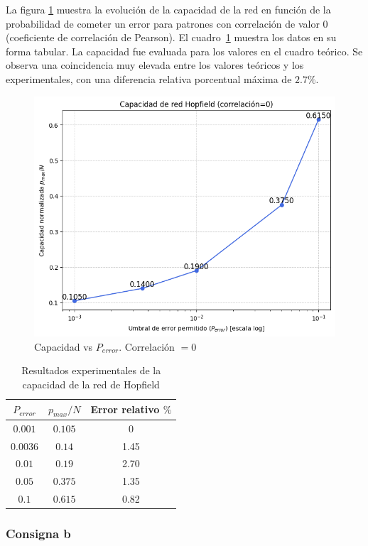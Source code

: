 \documentclass[11pt]{article} %
\begin{document}
La figura \ref{fig:ej2_1_1} muestra la evolución de la capacidad de la red en función de la probabilidad de cometer un error para patrones con correlación de valor $0$ (coeficiente de correlación de Pearson). El cuadro~\ref{tab:2} muestra los datos en su forma tabular. La capacidad fue evaluada para los valores en el cuadro teórico. Se observa una coincidencia muy elevada entre los valores teóricos y los experimentales, con una diferencia relativa porcentual máxima de $2.7\%$. 


\begin{figure}[h!]
    \centering
    \includegraphics[width=0.8\linewidth]{imgs/ej2_1_1.png}
    \caption{Capacidad vs $P_{error}$. Correlación $= 0$}
    \label{fig:ej2_1_1}
\end{figure}

\begin{table}[h!]
\centering
\begin{tabular}{|c|c|c|}
\hline
$P_{error}$ & $p_{max}/N$ &Error relativo $\%$\\ \hline
$0.001$     & $0.105$ & 0   \\ \hline
$0.0036$    & $0.14$   &  1.45\\ \hline
$0.01$      & $0.19$   &  2.70\\ \hline
$0.05$      & $0.375$ &   1.35  \\ \hline
$0.1$       & $0.615$    & 0.82 \\ \hline
\end{tabular}
\caption{Resultados experimentales de la capacidad de la red de Hopfield}
\label{tab:2}
\end{table}

\newpage

\subsubsection{Consigna b}
\end{document}
